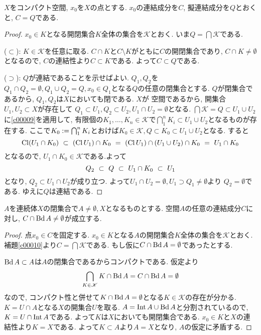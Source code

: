 \documentclass[uplatex, dvipdfmx, a4paper, 12pt, class=jsbook, crop=false]{standalone}
\begin{document}
\begin{lemma}
	\label{c00010}
	$ X $をコンパクト\Hausdorff 空間, $ x_0 $を$ X $の点とする.
	$ x_0 $の連結成分を$ C $, 擬連結成分を$ Q $とおくと, $ C = Q $である.
\end{lemma}

\begin{proof}
	$ x_0 \in K $となる開閉集合$ K $全体の集合を$ \mathscr{K} $とおく. いま$ Q  = \bigcap \mathscr{K}$である.

	($ \subset $): $ K \in \mathscr{K} $を任意に取る.
	$ C \cap K $と$ C \setminus K $がともに$ C $の開閉集合であり,
	$ C \cap K \neq \emptyset $となるので, $ C $の連結性より$ C \subset K $である.
	よって$ C \subset Q $である.

	($ \supset $): $ Q $が連結であることを示せばよい.
	$ Q_1, Q_2 $を$ Q_1 \cap Q_2 = \emptyset, Q_1 \cup Q_2 = Q , x_0 \in Q_1$となる$ Q $の任意の閉集合とする.
	$ Q $が閉集合であるから, $ Q_1, Q_2 $は$ X $においても閉である.
	$ X $が  空間であるから, 開集合$ U_1, U_2 \subset X $が存在して
	$ Q_1 \subset U_1, Q_2 \subset U_2, U_1 \cap U_2 = \emptyset $となる.
	$ \bigcap \mathscr{K} = Q \subset U_1 \cup U_2 $に\cref{c00009}を適用して,
	有限個の$ K_1 , \ldots, K_n \in \mathscr{K}$で$ \bigcap_{1}^{n} K_i \subset U_1 \cup U_2$となるものが存在する.
	ここで$ K_0 \mathrel{:=} \bigcap_{1}^{n} K_i $とおけば$ K_0 \in \mathscr{K}, Q \subset K_0 \subset U_1 \cup U_2 $となる.
	すると
	\[ \topcl \lrparen{U_1 \cap K_0} \longrel{\subset} \lrparen{\topcl U_1} \cap K_0
	\longrel{=} \left(\topcl U_1 \right) \cap (U_1 \cup U_2) \cap K_0 \longrel{=} U_1 \cap K_0\]
	となるので, $ U_1 \cap K_0 \in \mathscr{K} $である.よって
	\[ Q_2 \ \subset\  Q \ \subset\  U_1 \cap K_0 \ \subset\  U_1 \]
	となり, $ Q_2 \subset U_1 \cap U_2 $が成り立つ.
	よって$ U_1 \cap U_2 = \emptyset, U_1 \supset Q_1 \neq \emptyset $より
	$ Q_2 = \emptyset $である. ゆえに$ Q $は連結である.
\end{proof}

\begin{lemma}
	\label{c00011}
	$ A $を連続体$ X $の閉集合で$ A \neq \emptyset, X $となるものとする.
	空間$ A $の任意の連結成分$ C $に対し, $ C \cap \mathop{\mathrm{Bd}}\nolimits A \neq \emptyset $が成立する.
\end{lemma}

\begin{proof}
	点$ x_0 \in C $を固定する. $ x_0 \in K $となる$ A $の開閉集合$ K $全体の集合を$ \mathscr{K} $とおく.
	補題\cref{c00010}より$ C = \bigcap \mathscr{K} $である. もし仮に$ C \cap \mathop{\mathrm{Bd}}\nolimits A = \emptyset $であったとする.

	$ \mathop{\mathrm{Bd}}\nolimits A \subset A $は$ A $の閉集合であるからコンパクトである. 仮定より
	\[ \bigcap_{K \in \mathscr{K}} K \cap \mathop{\mathrm{Bd}}\nolimits A = C \cap \mathop{\mathrm{Bd}}\nolimits A = \emptyset \]
	なので, コンパクト性と併せて$ K \cap \mathop{\mathrm{Bd}}\nolimits A = \emptyset $となる$ K \in \mathscr{K} $の存在が分かる.
	$ K = U \cap A  $となる$ X $の開集合$ U $を取る. $ A = \mathop{\mathrm{Int}}\nolimits A \cup \mathop{\mathrm{Bd}}\nolimits A $と分割されているので,
	$ K = U \cap \mathop{\mathrm{Int}}\nolimits A $である. よって$ K $は$ X $においても開閉集合である.
	$ x_0 \in K $と$ X $の連結性より$ K = X $である.
	よって$ K \subset A $より$ A = X $となり, $ A $の仮定に矛盾する.
\end{proof}
\end{document}
